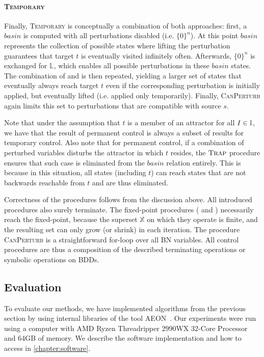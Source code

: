 \paragraph{\textsc{Temporary}} Finally, \textsc{Temporary} is conceptually a combination of both approaches: first, a $basin$ is computed with all perturbations disabled (i.e. $\{0\}^n$). At this point $basin$ represents the collection of possible states where lifting the perturbation guarantees that target $t$ is eventually visited infinitely often. Afterwards, $\{ 0 \}^n$ is exchanged for $\mathbb{L}$, which enables all possible perturbations in these $basin$ states. The combination of \bwd{} and \fwdClosed{} is then repeated, yielding a larger set of states that eventually always reach target $t$ even if the corresponding perturbation is initially applied, but eventually lifted (i.e. applied only temporarily). Finally, \textsc{CanPerturb} again limits this set to perturbations that are compatible with source $s$.

Note that under the assumption that $t$ is a member of an attractor for all $I \in \mathbb{I}$, we have that the result of permanent control is always a subset of results for temporary control. Also note that for permanent control, if a combination of perturbed variables disturbs the attractor in which $t$ resides, the $\textsc{Trap}$ procedure ensures that such case is eliminated from the $basin$ relation entirely. This is because in this situation, all states (including $t$) can reach states that are not backwards reachable from $t$ and are thus eliminated.

Correctness of the procedures follows from the discussion above. All introduced procedures also surely terminate. The fixed-point procedures (\bwd{} and \fwdClosed{}) necessarily reach the fixed-point, because the superset $\mathbb{X}$ on which they operate is finite, and the resulting set can only grow (or shrink) in each iteration. The procedure \textsc{CanPerturb} is a straightforward for-loop over all BN variables. All control procedures are thus a composition of the described terminating operations or symbolic operations on BDDs.

\subsection{Evaluation}
\label{sec:control_evaluation}

To evaluate our methods, we have implemented algorithms from the previous section by using internal libraries of the tool AEON~\cite{aeon}. Our experiments were run using a computer with AMD Ryzen Threadripper 2990WX 32-Core Processor and 64GB of memory. We describe the software implementation and how to access in \autoref{chapter:software}. %


